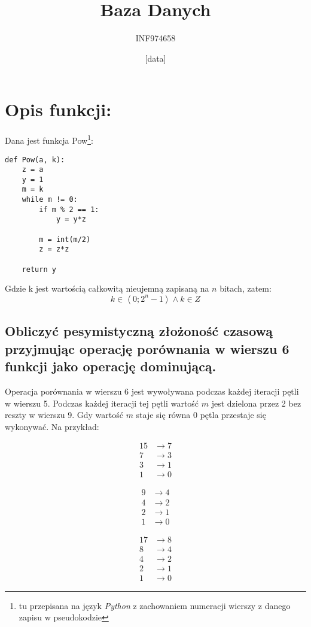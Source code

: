 \documentclass[a4paper,12pt]{article}
\title{Baza Danych}
\author{INF974658}
\date{[data]}
\begin{document}
\section*{Opis funkcji:}

Dana jest funkcja Pow\footnote{tu przepisana na język \emph{Python} z zachowaniem numeracji wierszy
z danego zapisu w pseudokodzie}:
\lstset{language = python,
	numbers = left,
	columns = fullflexible,
	frame = single}
	\begin{lstlisting}
def Pow(a, k):
	z = a
	y = 1
	m = k
	while m != 0:
		if m % 2 == 1:
			y = y*z
			
		m = int(m/2)
		z = z*z
		
	return y
	\end{lstlisting}
	
	Gdzie k jest wartością całkowitą nieujemną zapisaną na $n$ bitach, zatem:
	\[ k \in \left\langle 0 ; 2^n - 1 \right\rangle \wedge k \in Z\]
\subsection{Obliczyć pesymistyczną złożoność czasową przyjmując operację porównania w wierszu 6 funkcji
jako operację dominującą.}

Operacja porównania w wierszu 6 jest wywoływana podczas każdej iteracji pętli w wierszu 5. Podczas każdej
iteracji tej pętli wartość $m$ jest dzielona przez 2 bez reszty w wierszu 9. Gdy wartość $m$ staje się równa 0
pętla przestaje się wykonywać. Na przykład:


\begin{minipage}[c]{0.3\textwidth}
\begin{align*}
		15 &\rightarrow 7 \\
		7 &\rightarrow 3 \\
		3 &\rightarrow 1 \\
		1 &\rightarrow 0 
\end{align*}
\end{minipage}
\begin{minipage}[c]{0.3\textwidth}
\begin{align*}
		9 &\rightarrow 4 \\
		4 &\rightarrow 2 \\
		2 &\rightarrow 1 \\
		1 &\rightarrow 0 
\end{align*}
\end{minipage}
\begin{minipage}[c]{0.3\textwidth}
\begin{align*}
		17 &\rightarrow 8 \\
		8 &\rightarrow 4 \\
		4 &\rightarrow 2 \\
		2 &\rightarrow 1 \\
		1 &\rightarrow 0 
\end{align*}
\end{minipage}
\end{document}
